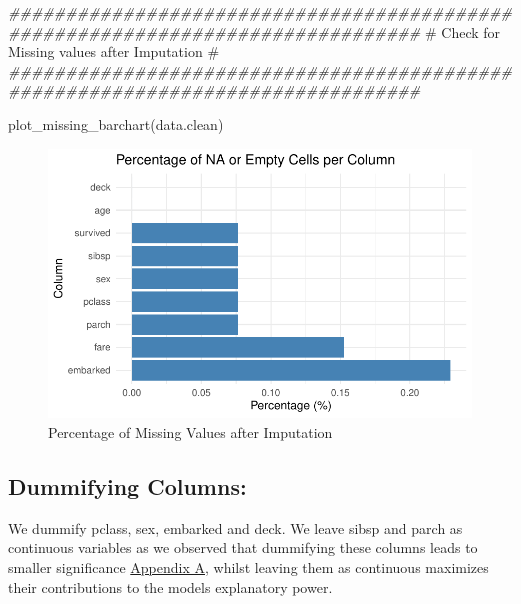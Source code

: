 \documentclass[
  letterpaper,
  DIV=11,
  numbers=noendperiod]{scrartcl}
\newenvironment{Shaded}{\begin{snugshade}}{\end{snugshade}}
\newcommand{\CommentTok}[1]{\textcolor[rgb]{0.37,0.37,0.37}{#1}}
\newcommand{\DocumentationTok}[1]{\textcolor[rgb]{0.37,0.37,0.37}{\textit{#1}}}
\newcommand{\FunctionTok}[1]{\textcolor[rgb]{0.28,0.35,0.67}{#1}}
\newcommand{\NormalTok}[1]{\textcolor[rgb]{0.00,0.23,0.31}{#1}}
\begin{document}
\begin{Shaded}
\begin{Highlighting}[]
\DocumentationTok{\#\#\#\#\#\#\#\#\#\#\#\#\#\#\#\#\#\#\#\#\#\#\#\#\#\#\#\#\#\#\#\#\#\#\#\#\#\#\#\#\#\#\#\#\#\#\#\#\#\#\#\#\#\#\#\#\#\#\#\#\#\#\#\#\#\#\#\#\#\#\#\#\#\#\#\#\#\#\#\#}
\CommentTok{\#          Check for Missing values after Imputation                           \#}
\DocumentationTok{\#\#\#\#\#\#\#\#\#\#\#\#\#\#\#\#\#\#\#\#\#\#\#\#\#\#\#\#\#\#\#\#\#\#\#\#\#\#\#\#\#\#\#\#\#\#\#\#\#\#\#\#\#\#\#\#\#\#\#\#\#\#\#\#\#\#\#\#\#\#\#\#\#\#\#\#\#\#\#\#}

\FunctionTok{plot\_missing\_barchart}\NormalTok{(data.clean)}
\end{Highlighting}
\end{Shaded}

\begin{figure}[H]

{\centering \includegraphics{FinalProject_files/figure-pdf/unnamed-chunk-6-1.pdf}

}

\caption{Percentage of Missing Values after Imputation}

\end{figure}%

\subsection{Dummifying Columns:}\label{dummifying-columns}

We dummify pclass, sex, embarked and deck. We leave sibsp and parch as
continuous variables as we observed that dummifying these columns leads
to smaller significance \hyperref[appendix_A]{Appendix A}, whilst
leaving them as continuous maximizes their contributions to the models
explanatory power.
\end{document}
